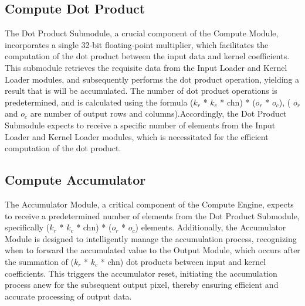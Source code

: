 \subsection{Compute Dot Product}
The Dot Product Submodule, a crucial component of the Compute Module, incorporates a single 32-bit floating-point multiplier, which facilitates the computation of the dot product between the input data and kernel coefficients. This submodule retrieves the requisite data from the Input Loader and Kernel Loader modules, and subsequently performs the dot product operation, yielding a result that is will be accumulated. The number of dot product operations is predetermined, and is calculated using the formula ($k_r$ * $k_c$ * chn) * ($o_r$ * $o_c$), ( $o_r$ and $o_c$ are number of output rows and columns).Accordingly, the Dot Product Submodule expects to receive a specific number of elements from the Input Loader and Kernel Loader modules, which is necessitated for the efficient computation of the dot product.
\subsection{Compute Accumulator}
The Accumulator Module, a critical component of the Compute Engine, expects to receive a predetermined number of elements from the Dot Product Submodule, specifically ($k_r$ * $k_c$ * chn) * ($o_r$ * $o_c$) elements. Additionally, the Accumulator Module is designed to intelligently manage the accumulation process, recognizing when to forward the accumulated value to the Output Module, which occurs after the summation of ($k_r$ * $k_c$ * chn) dot products between input and kernel coefficients. This triggers the accumulator reset, initiating the accumulation process anew for the subsequent output pixel, thereby ensuring efficient and accurate processing of output data.
